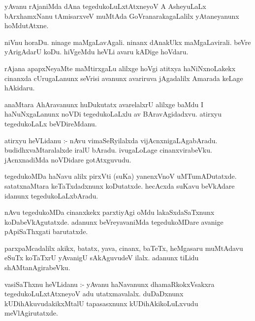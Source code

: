 \documentclass{article}
\begin{document}
\begin{mn}
yAvanu  rAjaniMda  dAna  tegedukoLuLxtAtxneyoV  A  AsheyuLaLx  bArxhamxNanu  
tAmisarxveV  muMtAda  GoVranarakagaLalilx  yAtaneyanunx  hoMdutAtxne.
\end{mn}

\begin{mn}
niVnu  horaDu.  ninage  maMgaLavAgali.  ninanx  dAnakUkx  maMgaLavirali.  
beVre  yArigAdarU  koDu. hiVgeMdu  heVLi  avaru  kADige  hoVdaru.
\end{mn}

\begin{mn}
rAjana  apapxNeyaMte  maMtirxgaLu  alilxge  hoVgi  atitxya  haNiNxnoLakekx  cinanxda  
cUrugaLanunx  seVrisi  avanunx  avariruva jAgadalilx  Amarada  keLage  hAkidaru.
\end{mn}

\begin{mn}
anaMtara  AhAravanunx  huDukutatx  avarelalxrU  alilxge  baMdu  I haNuNxgaLanunx  noVDi  
tegedukoLaLxlu  av  BAravAgidadxvu.  atirxyu  tegedukoLaLx beVDireMdanu.
\end{mn}

\begin{mn}
atirxyu  heVLidanu :- nAvu  vimaSeRyilalxda  vijAcnxnigaLAgabAradu.  budidhxvaMtaralalxde  
iralU  bAradu.  ivugaLoLage  cinanxvirabeVku.  jAcnxnadiMda  noVDidare  gotAtxguvudu.
\end{mn}

\begin{mn}
tegedukoMDa  haNavu  alilx  pirxVti (suKa) yanenxVnoV  uMTumADutatxde.  satatxnaMtara  
keTaTxdadxnunx  koDutatxde.  hecAcxda  suKavu  beVkAdare  idanunx  tegedukoLaLxbAradu.
\end{mn}

\begin{mn}
nAvu  tegedukoMDa  cinanxkekx  parxtiyAgi  oMdu  lakaSxdaSaTxnunx  koDabeVkAgutatxde.  
adanunx  beVreyavaniMda  tegedukoMDare  avanige  pApiSaThxgati  barutatxde.
\end{mn}

\begin{mn}
parxpaMcadalilx  akikx,  batatx,  yava,  cinanx,  baTeTx,  heMgasaru  muMtAdavu  eSuTx 
koTaTxrU  yAvanigU  sAkAguvudeV  ilalx.  adanunx  tiLidu  shAMtanAgirabeVku.
\end{mn}

\begin{mn}
vasiSaThxnu  heVLidanu :- yAvanu  haNavanunx  dhamaRkokxVsakxra  tegedukoLuLxtAtxneyoV  adu  
utatxmavalalx.  duDaDxnunx  kUDihAkuvudakikxMtalU  tapasasxnunx  kUDihAkikoLuLxvudu  meVlAgirutatxde.
\end{mn}
\end{document}
